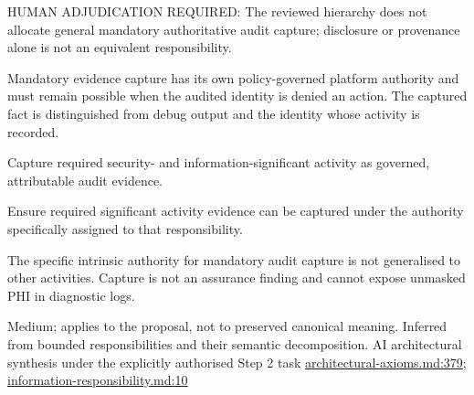 HUMAN ADJUDICATION REQUIRED: The reviewed hierarchy does not allocate general mandatory authoritative audit capture; disclosure or provenance alone is not an equivalent responsibility.



Mandatory evidence capture has its own policy-governed platform authority and must remain possible when the audited identity is denied an action. The captured fact is distinguished from debug output and the identity whose activity is recorded.



Capture required security- and information-significant activity as governed, attributable audit evidence.



Ensure required significant activity evidence can be captured under the authority specifically assigned to that responsibility.



The specific intrinsic authority for mandatory audit capture is not generalised to other activities. Capture is not an assurance finding and cannot expose unmasked PHI in diagnostic logs.


Medium; applies to the proposal, not to preserved canonical meaning.
Inferred from bounded responsibilities and their semantic decomposition. AI architectural synthesis under the explicitly authorised Step 2 task \hyperref[evidence:27549d51551beae6]{architectural-axioms.md:379}; \hyperref[evidence:be61392fefb4bb10]{information-responsibility.md:10}

